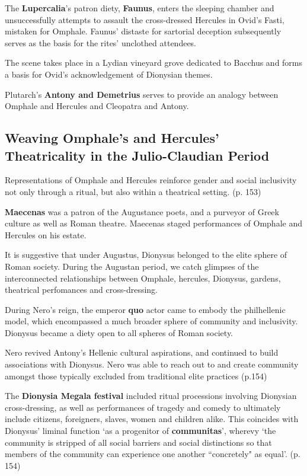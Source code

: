 The \textbf{Lupercalia}'s patron diety, \textbf{Faunus}, enters the sleeping chamber and unsuccessfully attempts to assault the cross-dressed Hercules in Ovid's Fasti, mistaken for Omphale. Faunus' distaste for sartorial deception subsequently serves as the basis for the rites' unclothed attendees.

\begin{rmk}
    The scene takes place in a Lydian vineyard grove dedicated to Bacchus and forms a basis for Ovid's acknowledgement of Dionysian themes.
\end{rmk}

Plutarch's \textbf{Antony and Demetrius} serves to provide an analogy between Omphale and Hercules and Cleopatra and Antony.


\subsection{Weaving Omphale's and Hercules' Theatricality in the Julio-Claudian Period}

Representations of Omphale and Hercules reinforce gender and social inclusivity not only through a ritual, but also within a theatrical setting. (p. 153)

\begin{rmk}
    \textbf{Maecenas} was a patron of the Augustance poets, and a purveyor of Greek culture as well as Roman theatre. Maecenas staged performances of Omphale and Hercules on his estate. 
\end{rmk}


It is suggestive that under Augustus, Dionysus belonged to the elite sphere of Roman society. During the Augustan period, we catch glimpses of the interconnected relationships between Omphale, hercules, Dionysus, gardens, theatrical perfomances and cross-dressing.

During Nero's reign, the emperor \textbf{quo} actor came to embody the philhellenic model, which encompassed a much broader sphere of community and inclusivity. Dionysus became a diety open to all spheres of Roman society.

\begin{rmk}
    Nero revived Antony's Hellenic cultural aspirations, and continued to build associations with Dionysus. Nero was able to reach out to and create community amongst those typically excluded from traditional elite practices (p.154)
\end{rmk}

The \textbf{Dionysia Megala festival} included ritual processions involving Dionysian cross-dressing, as well as performances of tragedy and comedy to ultimately include citizens, foreigners, slaves, women and children alike. This coincides with Dionysus' liminal function `as a progenitor of \textbf{communitas}', wherevy `the community is stripped of all social barriers and social distinctions so that members of the community can experience one another ``concretely" as equal'. (p. 154)


